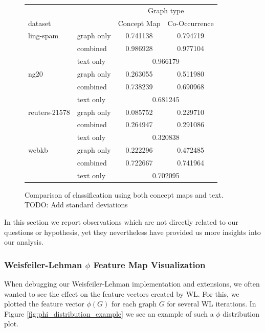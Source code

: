 \begin{figure}[htb!]
\centering
\begin{tabular}{llcc}
  &  & \multicolumn{2}{c}{Graph type} \\
   dataset   & &  Concept Map &  Co-Occurrence \\
\midrule
ling-spam 
          & graph only &  0.741138 &  0.794719\\
          & combined &  0.986928 &  0.977104\\
          & text only & \multicolumn{2}{c}{ 0.966179 }\\
\midrule
ng20 
          & graph only &  0.263055 &  0.511980\\
          & combined &  0.738239 &  0.690968\\
          & text only & \multicolumn{2}{c}{ 0.681245 }\\
\midrule
reuters-21578 
          & graph only &  0.085752 &  0.229710\\
          & combined &  0.264947 &  0.291086\\
          & text only & \multicolumn{2}{c}{ 0.320838 }\\
\midrule
webkb 
          & graph only &  0.222296 &  0.472485\\
          & combined &  0.722667 &  0.741964\\
          & text only & \multicolumn{2}{c}{ 0.702095 }\\	
\bottomrule
\end{tabular}
\caption{Comparison of classification using both concept maps and text. TODO: Add standard deviations}%
\label{fig:results_comparison_combined}
\end{figure}


In this section we report observations which are not directly related to our questions or hypothesis, yet they nevertheless have provided us more insights into our analysis.

\subsubsection{Weisfeiler-Lehman $\phi$ Feature Map Visualization}
When debugging our Weisfeiler-Lehman implementation and extensions, we often wanted to see the effect on the feature vectors created by WL.
For this, we plotted the feature vector $\phi(G)$ for each graph $G$ for several WL iterations.
In Figure \ref{fig:phi_distribution_example} we see an example of such a $\phi$ distribution plot.

